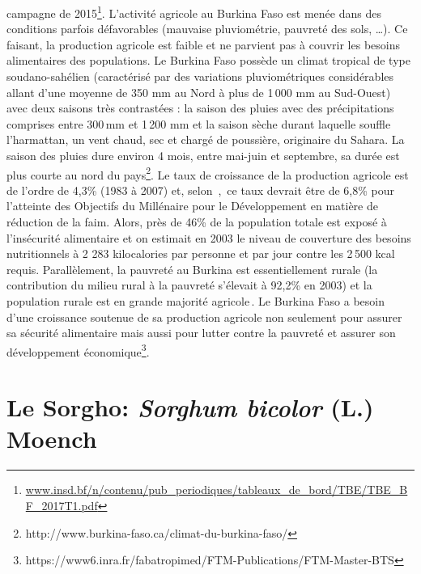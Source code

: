 \documentclass[a4paper,11pt]{article}
\begin{document}
campagne de
2015\footnote{\url{www.insd.bf/n/contenu/pub_periodiques/tableaux_de_bord/TBE/TBE_BF_2017T1.pdf}}. L’activité
agricole au Burkina Faso est menée dans des conditions parfois
défavorables (mauvaise pluviométrie, pauvreté des sols, \ldots{}). Ce
faisant, la production agricole est faible et ne parvient pas à
couvrir les besoins alimentaires des populations. Le Burkina Faso
possède un climat tropical de type soudano-sahélien (caractérisé par
des variations pluviométriques considérables allant d’une moyenne de
350 mm au Nord à plus de 1\,000 mm au Sud-Ouest) avec deux saisons
très contrastées : la saison des pluies avec des précipitations
comprises entre 300\,mm et 1\,200 mm et la saison sèche durant laquelle
souffle l’harmattan, un vent chaud, sec et chargé de poussière,
originaire du Sahara. La saison des pluies dure environ 4 mois, entre
mai-juin et septembre, sa durée est plus courte au nord du
pays\footnote{http://www.burkina-faso.ca/climat-du-burkina-faso/}. Le
taux de croissance de la production agricole est de l’ordre de 4,3\%
(1983 à 2007) et, selon
\,\citeauthor{Ngaido_2006},\,\citeyear{Ngaido_2006} ce taux devrait
être de 6,8\% pour l’atteinte des Objectifs du Millénaire pour le
Développement en matière de réduction de la faim. Alors, près de 46\%
de la population totale est exposé à l’insécurité alimentaire et on
estimait en 2003 le niveau de couverture des besoins nutritionnels à 2
283 kilocalories par personne et par jour contre les 2\,500 kcal
requis. Parallèlement, la pauvreté au Burkina est essentiellement
rurale (la contribution du milieu rural à la pauvreté s’élevait à
92,2\% en 2003) et la population rurale est en grande majorité
agricole\,\cite{DPSAA_2011}. Le Burkina Faso a besoin d’une croissance
soutenue de sa production agricole non seulement pour assurer sa
sécurité alimentaire mais aussi pour lutter contre la pauvreté et
assurer son développement
économique\footnote{https://www6.inra.fr/fabatropimed/FTM-Publications/FTM-Master-BTS}.

\section{Le Sorgho: \emph{Sorghum bicolor} (L.) Moench}



\end{document}
